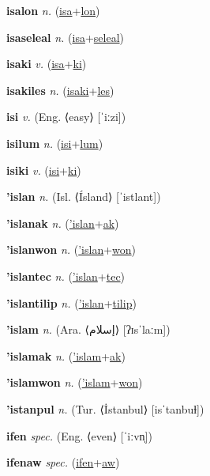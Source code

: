 \textbf{\hypertarget{isalon}{isalon}} \textit{n.} (\hyperlink{isa}{isa}+\allowbreak \hyperlink{lon}{lon})


\textbf{\hypertarget{isaseleal}{isaseleal}} \textit{n.} (\hyperlink{isa}{isa}+\allowbreak \hyperlink{seleal}{seleal})


\textbf{\hypertarget{isaki}{isaki}} \textit{v.} (\hyperlink{isa}{isa}+\allowbreak \hyperlink{ki}{ki})


\textbf{\hypertarget{isakiles}{isakiles}} \textit{n.} (\hyperlink{isaki}{isaki}+\allowbreak \hyperlink{les}{les})


\textbf{\hypertarget{isi}{isi}} \textit{v.} (Eng. ⟨easy⟩ [ˈiːzi])


\textbf{\hypertarget{isilum}{isilum}} \textit{n.} (\hyperlink{isi}{isi}+\allowbreak \hyperlink{lum}{lum})


\textbf{\hypertarget{isiki}{isiki}} \textit{v.} (\hyperlink{isi}{isi}+\allowbreak \hyperlink{ki}{ki})


\textbf{\hypertarget{'islan}{'islan}} \textit{n.} (Isl. ⟨Ísland⟩ [ˈistlant])


\textbf{\hypertarget{'islanak}{'islanak}} \textit{n.} (\hyperlink{'islan}{'islan}+\allowbreak \hyperlink{ak}{ak})


\textbf{\hypertarget{'islanwon}{'islanwon}} \textit{n.} (\hyperlink{'islan}{'islan}+\allowbreak \hyperlink{won}{won})


\textbf{\hypertarget{'islantec}{'islantec}} \textit{n.} (\hyperlink{'islan}{'islan}+\allowbreak \hyperlink{tec}{tec})


\textbf{\hypertarget{'islantilip}{'islantilip}} \textit{n.} (\hyperlink{'islan}{'islan}+\allowbreak \hyperlink{tilip}{tilip})


\textbf{\hypertarget{'islam}{'islam}} \textit{n.} (Ara. ⟨{\arabics{}إسلام}⟩ [ʔɪsˈlaːm])


\textbf{\hypertarget{'islamak}{'islamak}} \textit{n.} (\hyperlink{'islam}{'islam}+\allowbreak \hyperlink{ak}{ak})


\textbf{\hypertarget{'islamwon}{'islamwon}} \textit{n.} (\hyperlink{'islam}{'islam}+\allowbreak \hyperlink{won}{won})


\textbf{\hypertarget{'istanpul}{'istanpul}} \textit{n.} (Tur. ⟨İstanbul⟩ [isˈtanbuɫ])


\textbf{\hypertarget{ifen}{ifen}} \textit{spec.} (Eng. ⟨even⟩ [ˈiːvn̩])


\textbf{\hypertarget{ifenaw}{ifenaw}} \textit{spec.} (\hyperlink{ifen}{ifen}+\allowbreak \hyperlink{aw}{aw})


